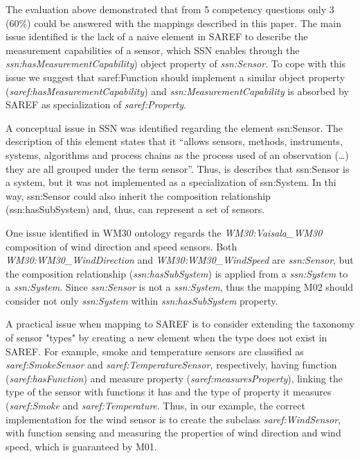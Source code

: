 \documentclass{sig-alternate-05-2015}
\begin{document}
The evaluation above demonstrated that from 5 competency questions only 3 (60\%) could be answered with the mappings described in this paper. The main issue identified is the lack of a naive element in SAREF to describe the measurement capabilities  of a sensor, which SSN enables through the \textit{ssn:hasMeasurementCapability}) object property of \textit{ssn:Sensor}. To cope with this issue we suggest that saref:Function should implement a similar object property (\textit{saref:hasMeasurementCapability}) and \textit{ssn:MeasurementCapability} is absorbed by SAREF as specialization of \textit{saref:Property}. 

A conceptual issue in SSN was identified regarding the element ssn:Sensor. The description of this element states that it “allows sensors, methods, instruments, systems, algorithms and process chains as the process used of an observation (…) they are all grouped under the term sensor”. Thus, is describes that ssn:Sensor is a system, but it was not implemented as a specialization of ssn:System. In thi way, ssn:Sensor could also inherit the composition relationship (ssn:hasSubSystem) and, thus, can represent a set of sensors. 

One issue identified in WM30 ontology regards the \textit{WM30:Vaisala\_WM30} composition of wind direction and speed sensors. Both \textit{WM30:WM30\_WindDirection} and \textit{WM30:WM30\_WindSpeed} are \textit{ssn:Sensor}, but the composition relationship (\textit{ssn:hasSubSystem}) is applied from a \textit{ssn:System} to a \textit{ssn:System}. Since \textit{ssn:Sensor} is not a \textit{ssn:System}, thus the mapping M02 should consider not only \textit{ssn:System} within \textit{ssn:hasSubSystem} property. 

A practical issue when mapping to SAREF is to consider extending the taxonomy of sensor "types" by creating a new element when the type does not exist in SAREF. For example, smoke and temperature sensors are classified as \textit{saref:SmokeSensor} and \textit{saref:TemperatureSensor,} respectively, having  function (\textit{saref:hasFunction}) and measure property (\textit{saref:measuresProperty}), linking the type of the sensor with functions it has and the type of property it measures (\textit{saref:Smoke} and \textit{saref:Temperature}. Thus, in our example, the correct implementation for the wind sensor is to create the subclass \textit{saref:WindSensor}, with function sensing and measuring the properties of wind direction and wind speed, which is guaranteed by M01. 
\end{document}
